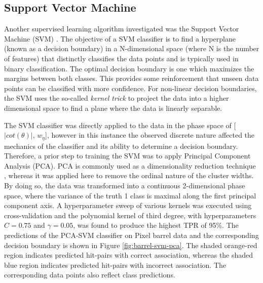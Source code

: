 \subsection{Support Vector Machine}


Another supervised learning algorithm investigated was the Support Vector Machine (SVM) \cite{svm}. The objective of a SVM classifier is to find a hyperplane (known as a decision boundary) in a N-dimensional space (where N is the number of features) that distinctly classifies the data points and is typically used in binary classification. The optimal decision boundary is one which maximizes the margins between both classes. This provides some reinforcement that unseen data points can be classified with more confidence. For non-linear decision boundaries, the SVM uses the so-called \textit{kernel trick} to project the data into a higher dimensional space to find a plane where the data is linearly separable. 

The SVM classifier was directly applied to the data in the phase space of  [$|cot(\theta)|$, $w_{\eta}$], however in this instance the observed discrete nature affected the mechanics of the classifier and its ability to determine a decision boundary. Therefore, a prior step to training the SVM was to apply Principal Component Analysis (PCA). PCA is commonly used as a dimensionality reduction technique \cite{pca}, whereas it was applied here to remove the ordinal nature of the cluster widths. By doing so, the data was transformed into a continuous 2-dimensional phase space, where the variance of the truth 1 class is maximal along the first principal component axis. A hyperparameter sweep of various kernels was executed using cross-validation and the polynomial kernel of third degree, with hyperparameters $C=0.75$ and $\gamma=0.05$, was found to produce the highest TPR of 95\%. The predictions of the PCA-SVM classifier on Pixel barrel data and the corresponding decision boundary is shown in Figure \ref{fig:barrel-svm-pca}. The shaded orange-red region indicates predicted hit-pairs with correct association, whereas the shaded blue region indicates predicted hit-pairs with incorrect association. The corresponding data points also reflect class predictions.  

